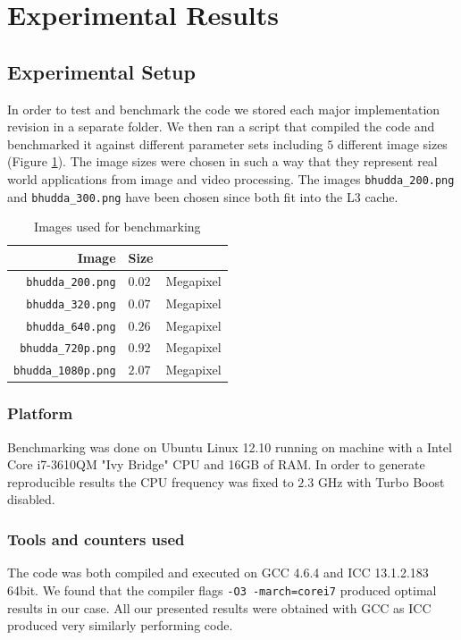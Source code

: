 \section{Experimental Results}\label{sec:exp}
\subsection{Experimental Setup}\label{sec:exp_setup8}
In order to test and benchmark the code we stored each major implementation revision in a separate folder. We then ran a script that compiled the code and benchmarked it against different parameter sets including $5$ different image sizes (Figure \ref{tab:images}). The image sizes were chosen in such a way that they represent real world applications from image and video processing. The images \texttt{bhudda\_200.png} and \linebreak\texttt{bhudda\_300.png} have been chosen since both fit into the L3 cache. 
\begin{table}
\centering
{\small
\begin{tabular}{|r|ll|}
\hline
\textbf{Image} & \textbf{Size} & \\
\hline
\texttt{bhudda\_200.png} & $0.02$ & Megapixel\\
\texttt{bhudda\_320.png} & $0.07$ & Megapixel\\
\texttt{bhudda\_640.png} & $0.26$ & Megapixel\\
\texttt{bhudda\_720p.png} & $0.92$ & Megapixel\\
\texttt{bhudda\_1080p.png} & $2.07$ & Megapixel\\
\hline
\end{tabular}
}
\caption{Images used for benchmarking}
\label{tab:images}
\end{table}

\subsubsection{Platform}
Benchmarking was done on Ubuntu Linux 12.10 running on machine with a Intel Core i7-3610QM "Ivy Bridge" CPU and 16GB of RAM. In order to generate reproducible results the CPU frequency was fixed to $2.3$ GHz with Turbo Boost disabled.

\subsubsection{Tools and counters used}
The code was both compiled and executed on GCC 4.6.4 and ICC 13.1.2.183 64bit. We found that the compiler flags \lstinline{-O3 -march=corei7} produced optimal results in our case. All our presented results were obtained with GCC as ICC produced very similarly performing code.

